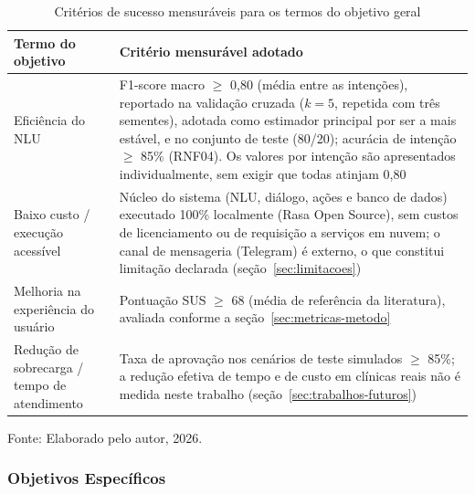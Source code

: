 \documentclass[12pt,a4paper]{extarticle}
\begin{document}
\begin{table}[H]
\centering
\caption{Critérios de sucesso mensuráveis para os termos do objetivo geral}
\label{tab:criterios-sucesso}
\begin{tabular}{p{3.5cm}p{9.5cm}}
\hline
\textbf{Termo do objetivo} & \textbf{Critério mensurável adotado} \\
\hline
Eficiência do NLU & F1-score macro $\geq$ 0,80 (média entre as intenções), reportado na validação cruzada ($k=5$, repetida com três sementes), adotada como estimador principal por ser a mais estável, e no conjunto de teste (80/20); acurácia de intenção $\geq$ 85\% (RNF04). Os valores por intenção são apresentados individualmente, sem exigir que todas atinjam 0,80 \\
Baixo custo / execução acessível & Núcleo do sistema (NLU, diálogo, ações e banco de dados) executado 100\% localmente (Rasa Open Source), sem custos de licenciamento ou de requisição a serviços em nuvem; o canal de mensageria (Telegram) é externo, o que constitui limitação declarada (seção~\ref{sec:limitacoes}) \\
Melhoria na experiência do usuário & Pontuação SUS $\geq$ 68 (média de referência da literatura), avaliada conforme a seção~\ref{sec:metricas-metodo} \\
Redução de sobrecarga / tempo de atendimento & Taxa de aprovação nos cenários de teste simulados $\geq$ 85\%; a redução efetiva de tempo e de custo em clínicas reais não é medida neste trabalho (seção~\ref{sec:trabalhos-futuros}) \\
\hline
\end{tabular}
\vspace{0.3cm}

\footnotesize{Fonte: Elaborado pelo autor, 2026.}
\end{table}

\subsubsection{Objetivos Específicos}
\label{sec:objetivos-especificos}
\end{document}
